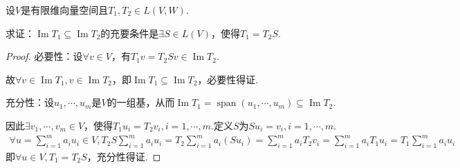 \newpage

\begin{problem}[25]\label{3.B.25}
    设\(V\)是有限维向量空间且\(T_1,T_2 \in L(V,W)\).

    求证：\(\operatorname{Im} T_1 \subseteq \operatorname{Im} T_2\)的充要条件是\(\exists S \in L(V)\)，使得\(T_1=T_2S\).    
\end{problem}

\begin{proof}
    必要性：设\(\forall v \in V\)，有\(T_1v=T_2Sv \in \operatorname{Im} T_2\).

    故\(\forall v \in \operatorname{Im} T_1, v \in \operatorname{Im} T_2\)，即\(\operatorname{Im} T_1 \subseteq \operatorname{Im} T_2\)，必要性得证. 
    
    充分性：设\(u_1,\cdots,u_m\)是\(V\)的一组基，从而\(\operatorname{Im} T_1=\operatorname{span}(u_1,\cdots,u_m) \subseteq \operatorname{Im} T_2\).
    
    因此\(\exists v_1,\cdots,v_m \in V\)，使得\(T_1u_i=T_2v_i,i=1,\cdots,m\).定义\(S\)为\(Su_i=v_i,i=1,\cdots,m\).
    \begin{align*}
        \forall u=\sum_{i=1}^m a_iu_i \in V,T_2S\sum_{i=1}^m a_iu_i=T_2\sum_{i=1}^m a_i(Su_i)
        =\sum_{i=1}^m a_iT_2v_i=\sum_{i=1}^m a_iT_1u_i=T_1\sum_{i=1}^m a_iu_i
    \end{align*}
    即\(\forall u \in V , T_1=T_2S\)，充分性得证.    
\end{proof}

\begin{comment}
    \begin{problem}[26]\label{3.B.26}
        设\(D \in L(P(R))\)满足\(\forall p \in P(R),\operatorname{deg} Dp=\operatorname{deg} p-1\).求证：\(D\)是满射变换.
    \end{problem}

    \begin{proof}
        根据\probref{3.B.10}，命题等价于
        \begin{align*}
            \operatorname{span} (D(x),D(x^2),\cdots)=\operatorname{Im} D=P(R)=\operatorname{span} (1,x,\cdots)
        \end{align*}
        根据\probref{2.C.10}，由于\(\operatorname{deg} Dp=\operatorname{deg} p-1\)，

        故\(\operatorname{span} (D(x),D(x^2),\cdots)=\operatorname{span} (1,x,\cdots)\)成立.        
    \end{proof}
\end{comment}

